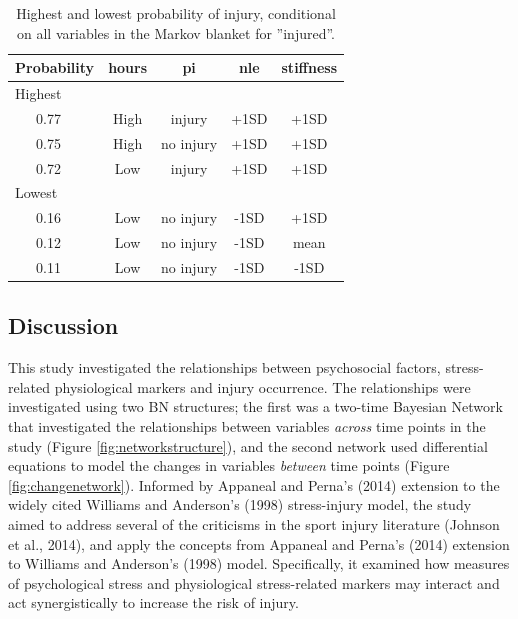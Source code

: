 \documentclass[
  english,
  man,floatsintext]{apa6}
\begin{document}
\begin{table}[H]

\begin{center}
\begin{threeparttable}

\caption{\label{tab:query7}Highest and lowest probability of injury, conditional on all variables in the Markov blanket for ''injured''.}

\begin{tabular}{lcccc}
\toprule
Probability & \multicolumn{1}{c}{hours} & \multicolumn{1}{c}{pi} & \multicolumn{1}{c}{nle} & \multicolumn{1}{c}{stiffness}\\
\midrule
Highest &  &  &  & \\
\ \ \ 0.77 & High & injury & +1SD & +1SD\\
\ \ \ 0.75 & High & no injury & +1SD & +1SD\\
\ \ \ 0.72 & Low & injury & +1SD & +1SD\\
Lowest &  &  &  & \\
\ \ \ 0.16 & Low & no injury & -1SD & +1SD\\
\ \ \ 0.12 & Low & no injury & -1SD & mean\\
\ \ \ 0.11 & Low & no injury & -1SD & -1SD\\
\bottomrule
\end{tabular}

\end{threeparttable}
\end{center}

\end{table}

\hypertarget{discussion}{%
\subsection{Discussion}\label{discussion}}

This study investigated the relationships between psychosocial factors, stress-related physiological markers and injury occurrence.
The relationships were investigated using two BN structures; the first was a two-time Bayesian Network that investigated the relationships between variables \emph{across} time points in the study (Figure \ref{fig:networkstructure}), and the second network used differential equations to model the changes in variables \emph{between} time points (Figure \ref{fig:changenetwork}).
Informed by Appaneal and Perna's (2014) extension to the widely cited Williams and Anderson's (1998) stress-injury model, the study aimed to address several of the criticisms in the sport injury literature (Johnson et al., 2014), and apply the concepts from Appaneal and Perna's (2014) extension to Williams and Anderson's (1998) model.
Specifically, it examined how measures of psychological stress and physiological stress-related markers may interact and act synergistically to increase the risk of injury.
\end{document}
